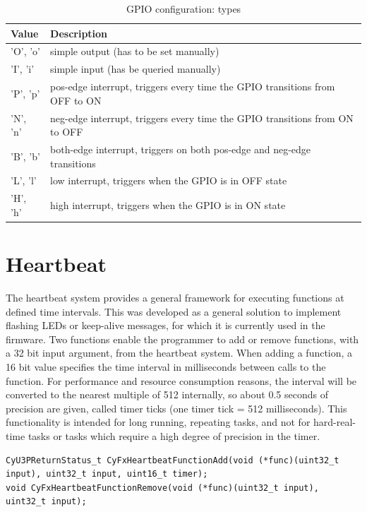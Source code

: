 \documentclass[a4paper,12pt]{report}
\begin{document}
\begin{table}[H]
\begin{center}
\caption{GPIO configuration: types}
\label{tab:gpio_configuration_types}
\begin{tabu} to \linewidth {|l|l|}
\hline
Value & Description \\ \hline
'O', 'o' & simple output (has to be set manually) \\ \hline
'I', 'i' & simple input (has be queried manually) \\ \hline
'P', 'p' & pos-edge interrupt, triggers every time the GPIO transitions from OFF to ON \\ \hline
'N', 'n' & neg-edge interrupt, triggers every time the GPIO transitions from ON to OFF \\ \hline
'B', 'b' & both-edge interrupt, triggers on both pos-edge and neg-edge transitions \\ \hline
'L', 'l' & low interrupt, triggers when the GPIO is in OFF state \\ \hline
'H', 'h' & high interrupt, triggers when the GPIO is in ON state \\ \hline
\end{tabu}
\end{center}
\end{table}

\section{Heartbeat} \label{sec:heartbeat}

The heartbeat system provides a general framework for executing functions at defined time intervals. This was developed as a general solution to implement flashing LEDs or keep-alive messages, for which it is currently used in the firmware.
Two functions enable the programmer to add or remove functions, with a 32 bit input argument, from the heartbeat system. When adding a function, a 16 bit value specifies the time interval in milliseconds between calls to the function. For performance and resource consumption reasons, the interval will be converted to the nearest multiple of 512 internally, so about 0.5 seconds of precision are given, called timer ticks (one timer tick = 512 milliseconds). This functionality is intended for long running, repeating tasks, and not for hard-real-time tasks or tasks which require a high degree of precision in the timer.

\begin{lstlisting}
CyU3PReturnStatus_t CyFxHeartbeatFunctionAdd(void (*func)(uint32_t input), uint32_t input, uint16_t timer);
void CyFxHeartbeatFunctionRemove(void (*func)(uint32_t input), uint32_t input);
\end{lstlisting}
\end{document}
